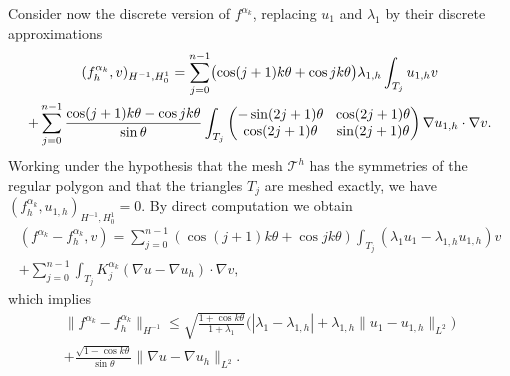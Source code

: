 \documentclass[JEP,XML,SOM,Unicode,ThmDefs,NoFloatCountersInSection,published]{cedram}
\newcommand{\colsep}{\arraycolsep4.5pt}
\theoremstyle{plain}
\theoremstyle{definition}
\begin{document}
Consider now the discrete version of $f^{\alpha_k}$, replacing $u_1$ and $\lambda_1$ by their discrete approximations\vspace*{-5pt}
\begin{multline*}
(f_h^{\alpha_k},v)_{H^{-1},H_0^1} = \sum_{j=0}^{n-1} \bigl(\cos (j+1)k\theta+\cos jk\theta\bigr) \lambda_{1,h} \int_{T_j} u_{1,h}v\\
\colsep+ \sum_{j=0}^{n-1} \frac{\cos(j+1)k\theta-\cos jk\theta}{\sin \theta} \int_{T_j}\begin{pmatrix}
-\sin (2j+1)\theta & \cos (2j+1) \theta \\
\cos(2j+1)\theta & \sin (2j+1)\theta
\end{pmatrix}\nabla u_{1,h} \cdot \nabla v.
\end{multline*}
Working under the hypothesis that the mesh $\mathcal T^h$ has the symmetries of the regular polygon and that the triangles $T_j$ are meshed exactly, we have $(f_h^{\alpha_k},u_{1,h})_{H^{-1},H_0^1} = 0$. By direct computation we obtain\vspace*{-5pt}
\begin{multline*}
(f^{\alpha_k}-f^{\alpha_k}_h,v) = \sum_{j=0}^{n-1} (\cos (j+1)k\theta+\cos jk\theta) \int_{T_j}(\lambda_1 u_1-\lambda_{1,h}u_{1,h})v\\[-8pt]
+ \sum_{j=0}^{n-1} \int_{T_j}K_j^{\alpha_k}(\nabla u - \nabla u_h)\cdot \nabla v,
\end{multline*}
which implies
\vspace*{-5pt}
\begin{multline*}
\|f^{\alpha_k}-f_h^{\alpha_k} \|_{H^{-1}} \leq \sqrt{\frac{1+\cos k\theta}{1+\lambda_1}}\bigl(|\lambda_1-\lambda_{1,h}|+\lambda_{1,h}\|u_1-u_{1,h}\|_{L^2}\bigr)\\
+ \frac{\sqrt{1-\cos k\theta}}{\sin \theta} \|\nabla u-\nabla u_h\|_{L^2}.
\end{multline*}
\end{document}

